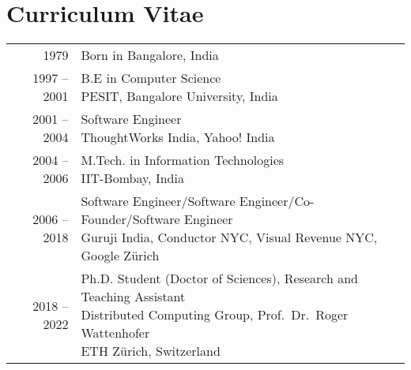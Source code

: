 \chapter*{Curriculum Vitae}

\vspace{-5em}
\vspace{5em}
\begin{tabular}{rl}
 1979 & Born in Bangalore, India\vspace{0.5cm}\\ %
 1997 -- 2001 & \makecell[l]{B.E in Computer Science\\PESIT, Bangalore University, India}\vspace{0.5cm}\\
 2001 -- 2004 & \makecell[l]{Software Engineer\\ThoughtWorks India, Yahoo! India}\vspace{0.5cm}\\
 2004 -- 2006 & \makecell[l]{M.Tech. in Information Technologies\\IIT-Bombay, India}\vspace{0.5cm}\\
 2006 -- 2018 & \makecell[l]{Software Engineer/Software Engineer/Co-Founder/Software Engineer\\Guruji India, Conductor NYC, Visual Revenue NYC, Google Z{\"u}rich}\vspace{0.5cm}\\
 2018 -- 2022 & \makecell[l]{Ph.D. Student (Doctor of Sciences), Research and Teaching Assistant\\Distributed Computing Group, Prof.\ Dr.\ Roger Wattenhofer\\ETH Z{\"u}rich, Switzerland}\vspace{0.5cm}
\end{tabular}
